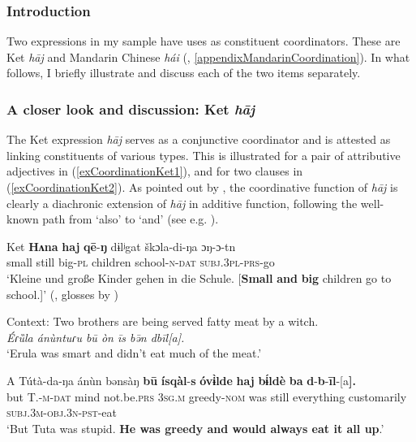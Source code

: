 {\subsubsection{Introduction}
Two expressions in my sample have uses as constituent coordinators. These are Ket \textit{hāj} and Mandarin Chinese \textit{hái} (, \ref{appendixMandarinCoordination}). In what follows, I briefly illustrate and discuss each of the two items separately.

\subsubsection{A closer look and discussion: Ket \textit{hāj}} The Ket expression \textit{hāj} serves as a conjunctive coordinator and is attested as linking constituents of various types. This is illustrated for a pair of attributive adjectives in (\ref{exCoordinationKet1}), and for two clauses in (\ref{exCoordinationKet2}). As pointed out by \textcite[96]{Nefedov2015}, the coordinative function of \textit{hāj} is clearly a diachronic extension of \textit{hāj} in additive function, following the well-known path from \lq also\rq{ }to \lq and\rq{ }(see e.g. \cite{Mithun1988}).

\begin{exe}
	\ex 
	\begin{xlist}
		\exi{}Ket
		\ex\label{exCoordinationKet1}	
		\gll \textbf{Hʌna} \textbf{haj} \textbf{qē}-\textbf{ŋ} dɨlʲgat škɔla-di-ŋa ɔŋ-ɔ-tn\\
		small still big-\textsc{pl} children school-\textsc{n}-\textsc{dat} \textsc{subj}.3\textsc{pl}-\textsc{prs}-go\\
	\glt \lq Kleine und große Kinder gehen in die Schule. [\textbf{Small} \textbf{and} \textbf{big} children go to school.]\rq{ }(\cite[321]{Werner1997}, glosses by \cite[97]{Nefedov2015})
		
	\ex\label{exCoordinationKet2}		
	Context: Two brothers are being served fatty meat by a witch.\\
	\textit{Éɾȕla ánùntuɾu bū òn īs bə̄n dbīl[a].}
	\\ \lq Erula was smart and didn't eat much of the meat.\rq{}

	\gll A Tútà-da-ŋa ánùn bənsàŋ \textbf{bū} \textbf{ísqàl}-\textbf{s} \textbf{óvɨ̀lde} \textbf{haj} \textbf{bɨ́ldè} \textbf{ba} \textbf{d}-\textbf{b}-\textbf{īl}-[a\textbf{].}\\
	but T.-\textsc{m}-\textsc{dat}  mind not.be.\textsc{prs} 3\textsc{sg}.\textsc{m} greedy-\textsc{nom} was still everything customarily \textsc{subj}.3\textsc{m}-\textsc{obj}.3\textsc{n}-\textsc{pst}-eat\\
	\glt \lq But Tuta was stupid. \textbf{He was greedy and would always eat it all up}.'
	\\\parencite[93]{Vajda2004}	
	\end{xlist}
\end{exe}

}
